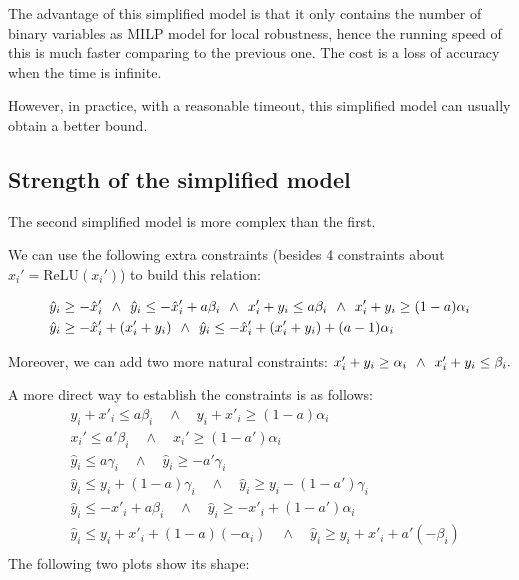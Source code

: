 \documentclass{llncs}
\newcommand{\ReLU}{\mathrm{ReLU}}
\begin{document}
	The advantage of this simplified model is that it only contains the number of binary variables as MILP model for local robustness, hence the running speed of this is much faster comparing to the previous one. The cost is a loss of accuracy when the time is infinite. 
	
	However, in practice, with a reasonable timeout, this simplified model can usually obtain a better bound.
	
	\subsection{Strength of the simplified model}

	The second simplified model is more complex than the first.
	
	We can use the following extra constraints (besides 4 constraints about $\hat{x}_i'=\ReLU(x_i')$) to build this relation:
	
	
	\begin{align*}
		&\hat{y}_i \geq -\hat{x}'_i \hspace*{1ex} \wedge \hspace*{1ex} \hat{y}_i \leq -\hat{x}'_i+a\beta_i  \hspace*{1ex}\wedge\hspace*{1ex} x_i'+y_i \leq a\beta_i \hspace*{1ex}\wedge\hspace*{1ex}  x_i'+y_i \geq (1-a)\alpha_i \\
		&\hat{y}_i \geq -\hat{x}'_i+(x_i'+y_i) \hspace*{1ex}\wedge\hspace*{1ex} \hat{y}_i \leq -\hat{x}'_i+(x_i'+y_i) +(a-1)\alpha_i \\
	\end{align*} 
	
	
	Moreover, we can add two more natural constraints: $x_i'+y_i \geq \alpha_i \hspace*{1ex}\wedge\hspace*{1ex}  x_i'+y_i \leq \beta_i.$
	
	
	
	A more direct way to establish the constraints is as follows: \begin{align*}
		& y_i+x'_i \leq a\beta_i \quad\wedge \quad y_i+x'_i\geq (1-a)\alpha_i\\	
		& x_i' \leq a'\beta_i \quad\wedge \quad x_i'\geq (1-a')\alpha_i\\
		&\hat{y}_i \leq a\gamma_i \quad\wedge \quad	\hat{y}_i \geq -a'\gamma_i \\
		&	\hat{y}_i \leq y_i+(1-a)\gamma_i \quad\wedge \quad	\hat{y}_i \geq y_i - (1-a')\gamma_i \\
		&	\hat{y}_i \leq -x'_i+a\beta_i \quad\wedge \quad	\hat{y}_i \geq -x'_i+(1-a')\alpha_i \\
		&	\hat{y}_i \leq y_i+x'_i+(1-a)(-\alpha_i)\quad\wedge \quad	\hat{y}_i \geq y_i+x'_i+a'(-\beta_i) \\
	\end{align*}The following two plots show its shape:
	
\end{document}

